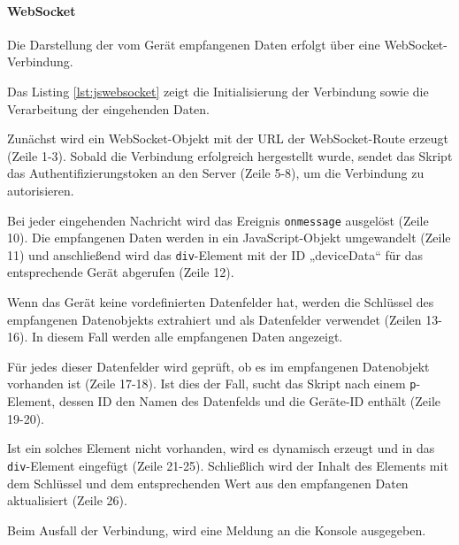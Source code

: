 \documentclass[12pt, letterpaper]{article}
\begin{document}
  \paragraph{WebSocket}
  \par \textbf{}
  \par Die Darstellung der vom Gerät empfangenen Daten erfolgt über eine WebSocket-Verbindung. 
  \par Das Listing \ref{lst:jswebsocket} zeigt die Initialisierung der Verbindung sowie die Verarbeitung der eingehenden Daten.
  \par Zunächst wird ein WebSocket-Objekt mit der URL der WebSocket-Route erzeugt (Zeile 1-3). Sobald die Verbindung erfolgreich hergestellt wurde, sendet das Skript das Authentifizierungstoken an den Server (Zeile 5-8), um die Verbindung zu autorisieren.
  \par Bei jeder eingehenden Nachricht wird das Ereignis \texttt{onmessage} ausgelöst (Zeile 10). Die empfangenen Daten werden in ein JavaScript-Objekt umgewandelt (Zeile 11) und anschließend wird das \texttt{div}-Element mit der ID „deviceData“ für das entsprechende Gerät abgerufen (Zeile 12).  
  \par Wenn das Gerät keine vordefinierten Datenfelder hat, werden die Schlüssel des empfangenen Datenobjekts extrahiert und als Datenfelder verwendet (Zeilen 13-16). In diesem Fall werden alle empfangenen Daten angezeigt.
  \par Für jedes dieser Datenfelder wird geprüft, ob es im empfangenen Datenobjekt vorhanden ist (Zeile 17-18). Ist dies der Fall, sucht das Skript nach einem \texttt{p}-Element, dessen ID den Namen des Datenfelds und die Geräte-ID enthält (Zeile 19-20). 
  \par Ist ein solches Element nicht vorhanden, wird es dynamisch erzeugt und in das \texttt{div}-Element eingefügt (Zeile 21-25). Schließlich wird der Inhalt des Elements mit dem Schlüssel und dem entsprechenden Wert aus den empfangenen Daten aktualisiert (Zeile 26).
  \par Beim Ausfall der Verbindung, wird eine Meldung an die Konsole ausgegeben.
  \pagebreak
\end{document}
